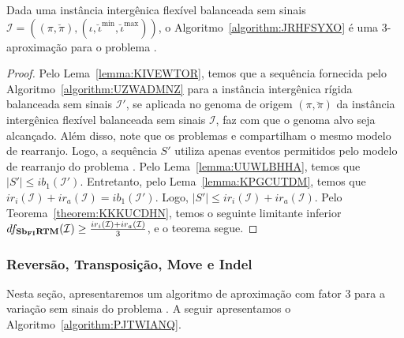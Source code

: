 \begin{theorem}\label{theorem:YTAKVOTU}
Dada uma instância intergênica flexível balanceada sem sinais $\mathcal{I} = ((\pi,\breve\pi),(\iota,\breve\iota^{\min},\breve\iota^{\max}))$, o Algoritmo~\ref{algorithm:JRHFSYXO} é uma $3$-aproximação para o problema \SbFIRTM{}.
\end{theorem}
\begin{proof}
Pelo Lema~\ref{lemma:KIVEWTOR}, temos que a sequência fornecida pelo Algoritmo~\ref{algorithm:UZWADMNZ} para a instância intergênica rígida balanceada sem sinais $\mathcal{I'}$, se aplicada no genoma de origem $(\pi,\breve\pi)$ da instância intergênica flexível balanceada sem sinais $\mathcal{I}$, faz com que o genoma alvo seja alcançado. Além disso, note que os problemas \SbIRTM{} e \SbFIRTM{} compartilham o mesmo modelo de rearranjo. Logo, a sequência $S'$ utiliza apenas eventos permitidos pelo modelo de rearranjo do problema \SbFIRTM{}. Pelo Lema~\ref{lemma:UUWLBHHA}, temos que $|S'| \le ib_1(\mathcal{I}')$. Entretanto, pelo Lema~\ref{lemma:KPGCUTDM}, temos que $ir_i(\mathcal{I}) + ir_a(\mathcal{I}) = ib_1(\mathcal{I'})$. Logo, $|S'| \le ir_i(\mathcal{I}) + ir_a(\mathcal{I})$. Pelo Teorema~\ref{theorem:KKKUCDHN}, temos o seguinte limitante inferior $df_{\textbf{Sb\textsubscript{FI}RTM}}(\mathcal{I}) \ge \frac{ir_i(\mathcal{I}) + ir_a(\mathcal{I})}{3}$, e o teorema segue.
\end{proof}

\subsubsection{Reversão, Transposição, Move e Indel}

Nesta seção, apresentaremos um algoritmo de aproximação com fator $3$ para a variação sem sinais do problema \SbFIRTMI{}. A seguir apresentamos o Algoritmo~\ref{algorithm:PJTWIANQ}.



